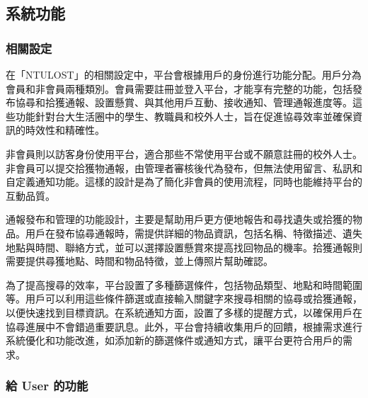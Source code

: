 \documentclass[12pt,a4paper]{article}
\begin{document}

\subsection{系統功能}    

\subsubsection{相關設定}

在「NTULOST」的相關設定中，平台會根據用戶的身份進行功能分配。用戶分為會員和非會員兩種類別。會員需要註冊並登入平台，才能享有完整的功能，包括發布協尋和拾獲通報、設置懸賞、與其他用戶互動、接收通知、管理通報進度等。這些功能針對台大生活圈中的學生、教職員和校外人士，旨在促進協尋效率並確保資訊的時效性和精確性。

非會員則以訪客身份使用平台，適合那些不常使用平台或不願意註冊的校外人士。非會員可以提交拾獲物通報，由管理者審核後代為發布，但無法使用留言、私訊和自定義通知功能。這樣的設計是為了簡化非會員的使用流程，同時也能維持平台的互動品質。

通報發布和管理的功能設計，主要是幫助用戶更方便地報告和尋找遺失或拾獲的物品。用戶在發布協尋通報時，需提供詳細的物品資訊，包括名稱、特徵描述、遺失地點與時間、聯絡方式，並可以選擇設置懸賞來提高找回物品的機率。拾獲通報則需要提供尋獲地點、時間和物品特徵，並上傳照片幫助確認。

為了提高搜尋的效率，平台設置了多種篩選條件，包括物品類型、地點和時間範圍等。用戶可以利用這些條件篩選或直接輸入關鍵字來搜尋相關的協尋或拾獲通報，以便快速找到目標資訊。在系統通知方面，設置了多樣的提醒方式，以確保用戶在協尋進展中不會錯過重要訊息。此外，平台會持續收集用戶的回饋，根據需求進行系統優化和功能改進，如添加新的篩選條件或通知方式，讓平台更符合用戶的需求。


\subsubsection{給 User 的功能}
\end{document}
